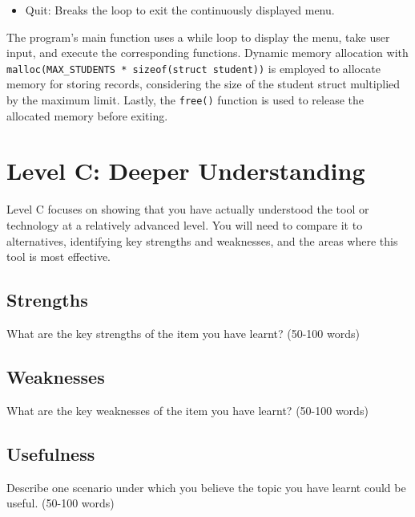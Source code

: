 \documentclass[a4paper, 11pt]{report}
\begin{document}
\begin{itemize}
\begin{lstlisting}[language=C]
void display_all_students() {
    ...
    for (i = 0; i < num_records; i++) {
        printf("Name: %s\n", records[i].name);
        ...
        printf("\n");
    }
}
\end{lstlisting}

\item Quit: Breaks the loop to exit the continuously displayed menu.
\end{itemize}

The program's main function uses a while loop to display the menu, take user input, and execute the corresponding functions. Dynamic memory allocation with \texttt{malloc(MAX\_STUDENTS * sizeof(struct student))} is employed to allocate memory for storing records, considering the size of the student struct multiplied by the maximum limit. Lastly, the \texttt{free()} function is used to release the allocated memory before exiting.



\newpage
\section{Level C: Deeper Understanding}

Level C focuses on showing that you have actually understood the tool or technology at a relatively advanced level. You will need to compare it to alternatives, identifying key strengths and weaknesses, and the areas where this tool is most effective. 

\subsection{Strengths}
What are the key strengths of the item you have learnt? (50-100 words)

\subsection{Weaknesses}
What are the key weaknesses of the item you have learnt? (50-100 words)

\subsection{Usefulness}
Describe one scenario under which you believe the topic you have learnt could be useful. (50-100 words)
\end{document}
